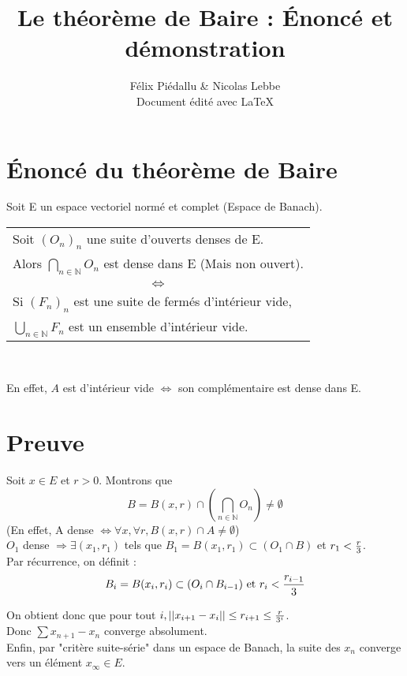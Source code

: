 \documentclass[10pt,a4paper]{article}
\author{Félix Piédallu \& Nicolas Lebbe \\ {\footnotesize Document édité avec \LaTeX}}
\title{Le théorème de Baire : Énoncé et démonstration}
\date{}
\begin{document}
\thispagestyle{empty}
\part*{Énoncé du théorème de Baire}
Soit E un espace vectoriel normé et complet (Espace de Banach).
\begin{center}
\begin{tabular}{|l|}
\hline
Soit $(O_n)_n$ une suite d'ouverts denses de E.\\
Alors $\bigcap_{n \in\mathbb{N}} O_n$ est dense dans E (Mais non ouvert). \\
\hline
\multicolumn{1}{c}{$\Leftrightarrow$} \\
\hline
Si $(F_n)_n$ est une suite de fermés d'intérieur vide,\\
$\bigcup_{n \in \mathbb{N}} F_n$ est un ensemble d'intérieur vide. \\
\hline
\end{tabular} \\
\end{center}
En effet, $A$ est d'intérieur vide $\Leftrightarrow$ son complémentaire est dense dans E. 
\part*{Preuve}
Soit $x \in E$ et $r >0 $. Montrons que 
\begin{equation}
B=B(x,r) \cap (\bigcap_{n \in \mathbb{N}} O_n) \neq \emptyset
\end{equation}
(En effet, A dense $\Leftrightarrow \forall x, \forall r, B(x,r) \cap A \neq \emptyset $)\\

$O_1$ dense $\Rightarrow \exists (x_1, r_1)$ tels que $B_1 = B(x_1,r_1) \subset (O_1 \cap B)$ et $r_1 < {r \over 3}$.\\
Par récurrence, on définit :
\begin{equation*} B_i = B(x_i, r_i) \subset (O_i \cap B_{i-1}) \text{ et } r_i < {r_{i-1} \over 3} 
\end{equation*}

On obtient donc que pour tout $i, ||x_{i+1}-x_{i}|| \leq r_{i+1} \leq {r \over 3^i}$.\\

Donc $ \sum x_{n+1} - x_n$ converge absolument.\\
Enfin, par "critère suite-série" dans un espace de Banach, la suite des $x_n$ converge vers un élément $x_\infty \in E$.\\
\end{document}
